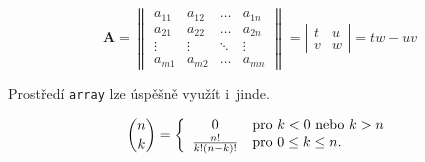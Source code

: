 \documentclass[twocolumn, a4paper, 11pt]{article}
\theoremstyle{definition}
\theoremstyle{plain}
\begin{document}
$$
    \mathbf{A} =
    \left\|
    \begin{array}{cccc}
        a_{11} & a_{12} & \ldots & a_{1n} \\
         a_{21} & a_{22} & \ldots & a_{2n} \\
          \vdots & \vdots & \ddots & \vdots \\
           a_{m1} & a_{m2} & \ldots & a_{mn}
    \end{array}
    \right\|
    =
    \left|
    \begin{array}{cc}
        t & u \\
        v & w
    \end{array}
    \right|
    = tw - uv
$$

Prostředí \verb|array| lze úspěšně využít i~jinde.

$$
    \binom{n}{k} =
    \left\{
    \begin{array}{cl}
        0 & \textnormal{pro } k < 0 \textnormal{ nebo } k > n  \\
        \frac{n!}{k!(n-k)!} & \textnormal{pro } 0 \leq k \leq n \textnormal{.}
    \end{array}
    \right.
$$
\end{document}
